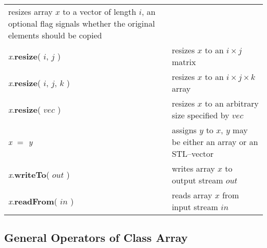 \begin{tabular}{l|l}
\begin{minipage}{30em}
resizes array $x$ to a vector of
length $i$, an optional flag signals whether the original elements should be
copied
\end{minipage}\\[1.5ex]
{\em x}.{\sffamily\bfseries\small resize}( $i$, $j$ ) & resizes $x$ to an $i\times j$
matrix\\
{\em x}.{\sffamily\bfseries\small resize}( $i$, $j$, $k$ ) & resizes $x$ to an
$i\times j\times k$ array \\
{\em x}.{\sffamily\bfseries\small resize}( $vec$ ) & resizes $x$ to an arbitrary size specified by $vec$\\
\hline
{\em x} $=$ {\em y} & assigns $y$ to $x$, $y$ may be either an array or an STL--vector\\
{\em x}.{\sffamily\bfseries\small writeTo}( $out$ ) & writes array $x$ to output stream $out$\\
{\em x}.{\sffamily\bfseries\small readFrom}( $in$ ) & reads array $x$ from input stream $in$\\
\hline
\end{tabular}


	\subsection{General Operators of Class Array}

